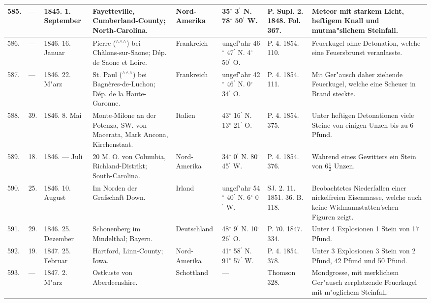 \documentclass[a4paper, 8pt, oneside, polutonikogreek, german]{article}
\begin{document}
\begin{center}
\begin{longtable}{| p{4mm} | p{2mm} | p{15mm} | p{25mm} | p{16mm} | p{12mm} | p{13mm} | p{20mm} |}
        585. & --- & 1845. 1. September & Fayetteville, Cumberland-County; North-Carolina. & Nord-Amerika & 35$^\circ$ 3$^\prime$ N. 78$^\circ$ 50$^\prime$ W. & P. Supl. 2. 1848. Fol. 367. & Meteor mit starkem Licht, heftigem Knall und mutma"slichem Steinfall. \\ \hline
        586. & --- & 1846. 16. Januar & Pierre ($^\wedge$$^\wedge$$^\wedge$) bei Chàlons-sur-Saone; Dép. de Saone et Loire. & Frankreich & ungef"ahr 46$^\circ$ 47$^\prime$ N. 4$^\circ$ 50$^\prime$ O. & P. 4. 1854. 110. & Feuerkugel ohne Detonation, welche eine Feuersbrunst veranlasste. \\ \hline
        587. & --- & 1846. 22. M"arz & St. Paul ($^\wedge$$^\wedge$$^\wedge$) bei Bagnères-de-Luchon; Dép. de la Haute-Garonne. & Frankreich & ungef"ahr 42$^\circ$ 46$^\prime$ N. 0$^\circ$ 34$^\prime$ O. & P. 4. 1854. 111. & Mit Ger"ausch daher ziehende Feuerkugel, welche eine Scheuer in Brand steckte. \\ \hline
        588. & 39. & 1846. 8. Mai & Monte-Milone an der Potenza, SW. von Macerata, Mark Ancona, Kirchenstaat. & Italien & 43$^\circ$ 16$^\prime$ N. 13$^\circ$ 21$^\prime$ O. & P. 4. 1854. 375. & Unter heftigen Detonationen viele Steine von einigen Unzen bis zu 6 Pfund. \\ \hline
        589. & 18. & 1846. --- Juli & 20 M. O. von Columbia, Richland-Distrikt; South-Carolina. & Nord-Amerika & 34$^\circ$ 0$^\prime$ N. 80$^\circ$ 45$^\prime$ W. & P. 4. 1854. 376. & Wahrend eines Gewitters ein Stein von $6\frac{1}{2}$ Unzen. \\ \hline
        590. & 25. & 1846. 10. August & Im Norden der Grafschaft Down. & Irland & ungef"ahr 54$^\circ$ 40$^\prime$ N. 6$^\circ$ 0$^\prime$ W. & SJ. 2. 11. 1851. 36. B. 118. & Beobachtetes Niederfallen einer nickelfreien Eisenmasse, welche auch keine Widmannstatten'schen Figuren zeigt. \\ \hline
        591. & 29. & 1846. 25. Dezember & Schonenberg im Mindelthal; Bayern. & Deutschland & 48$^\circ$ 9$^\prime$ N. 10$^\circ$ 26$^\prime$ O. & P. 70. 1847. 334. & Unter 4 Explosionen 1 Stein von 17 Pfund. \\ \hline
        592. & 19. & 1847. 25. Februar & Hartford, Linn-County; Iowa. & Nord-Amerika & 41$^\circ$ 58$^\prime$ N. 91$^\circ$ 57$^\prime$ W. & P. 4. 1854. 378. & Unter 3 Explosionen 3 Stein von 2 Pfund, 42 Pfund und 50 Pfund. \\ \hline
        593. & --- & 1847. 2. M"arz & Ostkuste von Aberdeenshire. & Schottland & --- & Thomson 328. & Mondgrosse, mit merklichem Ger"ausch zerplatzende Feuerkugel mit m"oglichem Steinfall. \\ \hline

\end{longtable}
\end{center}
\end{document}
